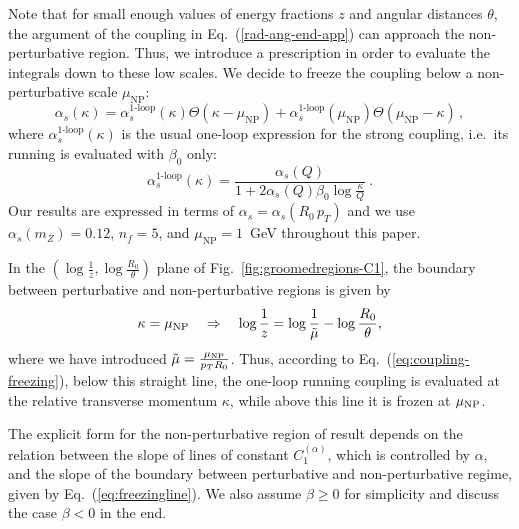 \documentclass[letterpaper,11pt]{article}
\newcommand{\as}{\alpha_s}
\newcommand{\C}[2]{C^{(#2)}_{#1}}
\newcommand{\ea}{{\C{1}{\alpha}}}
\DeclareRobustCommand{\Fig}[1]{Fig.~\ref{#1}}
\DeclareRobustCommand{\Eq}[1]{Eq.~(\ref{#1})}
\begin{document}
Note that for small enough values of energy fractions $z$ and angular distances $\theta$, the argument of the coupling in \Eq{rad-ang-end-app} can approach the non-perturbative region.  Thus, we introduce a prescription in order to evaluate the integrals down to these low scales. We decide to freeze the coupling below a non-perturbative scale $\mu_\text{NP}$:
\begin{equation}\label{eq:coupling-freezing}
\as (\kappa)= \as^\text{1-loop}(\kappa)\Theta\left (\kappa-\mu_\text{NP}\right)+\as^\text{1-loop}(\mu_\text{NP})\Theta\left (\mu_\text{NP}-\kappa\right)\,,
\end{equation}
where $\as^\text{1-loop}(\kappa)$ is the usual one-loop expression for
the strong coupling, i.e.\ its running is evaluated with $\beta_0$ only:
\begin{equation}\label{eq:coupling-1loop}
\as^\text{1-loop}(\kappa)=\frac{\as(Q)}{1+2 \as(Q) \beta_0 \log \frac{\kappa}{Q}} \ .
\end{equation}
Our results are expressed in terms of $\as=\as(R_0\, p_T)$ and
we use $\as(m_Z)=0.12$, $n_f=5$, and $\mu_\text{NP}=1$~GeV
throughout this paper.

In the $(\log \frac{1}{z},\log \frac{R_0}{\theta})$ plane of \Fig{fig:groomedregions-C1}, the boundary between perturbative and non-perturbative regions is given by
\begin{equation}
\label{eq:freezingline}
\kappa = \mu_{\rm NP}  \quad \Rightarrow \quad \log \frac{1}{z} = \log\frac{1}{\tilde{\mu}}-\log \frac{R_0}{\theta},
\end{equation}
where we have introduced $\tilde{\mu}=\frac{\mu_{\rm NP}}{p_T R_0}$.
Thus, according to \Eq{eq:coupling-freezing}, below this straight line, the one-loop running coupling is evaluated at the relative transverse momentum $\kappa$, while above this line it is frozen at $\mu_{\rm NP}$.

The explicit form for the non-perturbative region of result depends on the relation between the slope of lines of constant $\ea$, which is controlled by $\alpha$, and the slope of the boundary between perturbative and non-perturbative regime, given by \Eq{eq:freezingline}.  We also assume $ \beta\ge0$ for simplicity and discuss the case $\beta<0$ in the end.
\end{document}
